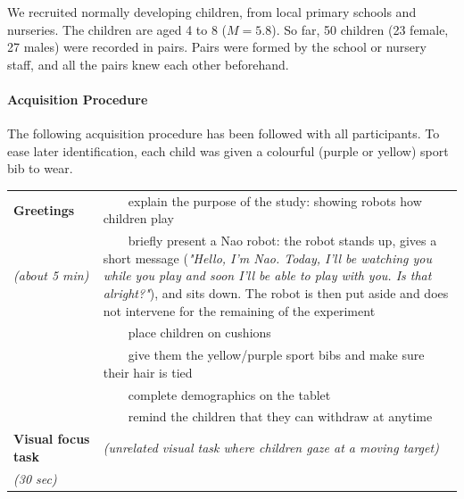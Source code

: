 \documentclass{article}
\begin{document}
We recruited normally developing children, from local primary schools and
nurseries. The children are aged 4 to 8 ($M=5.8$). So far, 50 children (23
female, 27 males) were recorded in pairs. Pairs were formed by the school or
nursery staff, and all the pairs knew each other beforehand.

\paragraph{Acquisition Procedure}

The following acquisition procedure has been followed with all participants. To
ease later identification, each child was given a colourful (purple or yellow)
sport bib to wear.

\newcommand{\tabitem}{~~\llap{\textbullet}~~}
    \begin{tabular}{@{}p{0.2\linewidth}p{0.8\linewidth}@{}}
\toprule
\bf Greetings                     & \tabitem explain the purpose of the study: showing robots how children play  \\
\emph{(about 5 min)}              & \tabitem briefly present a Nao robot: the robot stands up, gives a short
                                    message (\emph{"Hello, I'm Nao. Today, I'll be watching you while you
                                    play and soon I'll be able to play with you. Is that alright?"}), and
                                    sits down. The robot is then put aside and does not intervene
                                    for the remaining of the experiment \\
                                  & \tabitem place children on cushions \\ 
                                  & \tabitem give them the yellow/purple sport
                                  bibs and make sure their hair is tied \\ 
                                  & \tabitem complete demographics on the tablet \\
                                  & \tabitem remind the children that they can withdraw at anytime \\ \midrule
\bf Visual focus task             & \emph{(unrelated visual task where children gaze at a moving target)}\\ 
\emph{(30 sec)}                   & \\ \midrule

\end{tabular}
\end{document}
